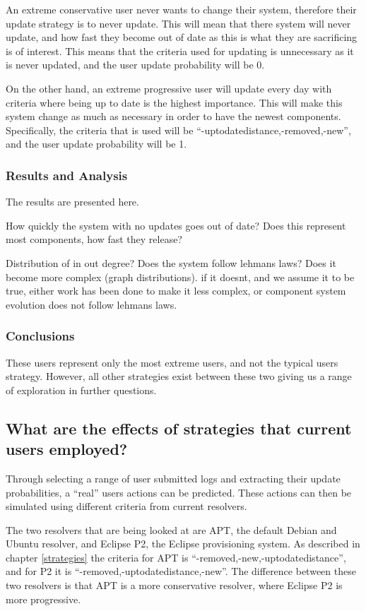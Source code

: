 An extreme conservative user never wants to change their system, therefore their update strategy is to never update.
This will mean that there system will never update, and how fast they become out of date as this is what they are sacrificing is of interest.
This means that the criteria used for updating is unnecessary as it is never updated, and the user update probability will be 0.

On the other hand, an extreme progressive user will update every day with criteria where being up to date is the highest importance.
This will make this system change as much as necessary in order to have the newest components.
Specifically, the criteria that is used will be ``-uptodatedistance,-removed,-new'', and the user update probability will be 1.

\subsubsection{Results and Analysis}
The results are presented here.

How quickly the system with no updates goes out of date?
Does this represent most components, how fast they release?

Distribution of in out degree?
Does the system follow lehmans laws?
Does it become more complex (graph distributions).
if it doesnt, and we assume it to be true, either work has been done to make it less complex, or component system evolution does not follow lehmans laws.

\subsubsection{Conclusions}
These users represent only the most extreme users, and not the typical users strategy.
However, all other strategies exist between these two giving us a range of exploration in further questions.

\subsection{What are the effects of strategies that current users employed?}
Through selecting a range of user submitted logs and extracting their update probabilities, a ``real'' users actions can be predicted.
These actions can then be simulated using different criteria from current resolvers.

The two resolvers that are being looked at are APT, the default Debian and Ubuntu resolver, and Eclipse P2, the Eclipse provisioning system.
As described in chapter \ref{strategies} the criteria for APT is ``-removed,-new,-uptodatedistance'', and for P2 it is ``-removed,-uptodatedistance,-new''.
The difference between these two resolvers is that APT is a more conservative resolver, where Eclipse P2 is more progressive.

